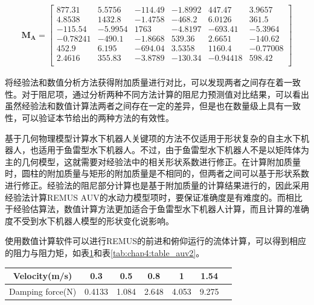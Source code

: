 \begin{equation}
\begin{aligned}
\bm{M_{A}} = \begin{bmatrix}
     877.31 &   5.5756 &  -114.49 &  -1.8992 &   447.47 &   3.9657\\
     4.8538 &   1432.8 &  -1.4758 &  -468.2  &   6.0126 &    361.5\\
     -115.54 &  -5.9954  &  1763  &  -4.8197 &  -693.41 &  -5.3964\\
     -0.78241 &  -490.1  &  -1.8668  &  539.36 & 2.6651  &  -140.62\\
     452.9  &  6.195 &  -694.04  &  3.5358 &   1160.4  & -0.77008\\
     2.4616  &  355.83 &  -3.8789 &  -130.34 &  -0.94418  &  598.42\\
         \end{bmatrix}
\end{aligned}
\end{equation}


将经验法和数值分析方法获得附加质量进行对比，可以发现两者之间存在着一致性。对于阻尼项，通过分析两种不同方法计算的阻尼力预测值对比结果，可以看出虽然经验法和数值计算法两者之间存在一定的差异，但是也在数量级上具有一致性，可以验证本节给出的两种方法的有效性。

基于几何物理模型计算水下机器人关键项的方法不仅适用于形状复杂的自主水下机器人，也适用于鱼雷型水下机器人。不过，由于鱼雷型水下机器人不是以矩阵体为主的几何模型，这就需要对经验法中的相关形状系数进行修正。在计算附加质量时，圆柱的附加质量与矩形的附加质量是不相同的，但两者之间可以基于形状系数进行修正。经验法的阻尼部分计算也是基于附加质量的计算结果进行的，因此采用经验法计算REMUS AUV的水动力模型项时，要保证准确度是有难度的。而相比于经验估算法，数值计算方法更加适合于鱼雷型水下机器人计算，而且计算的准确度不受到水下机器人模型的形状变化说影响。

使用数值计算软件可以进行REMUS的前进和俯仰运行的流体计算，可以得到相应的阻力与阻力矩，如表\ref{tab:chap4:table_auv1}和表\ref{tab:chap4:table_auv2}。

\begin{table}
\centering
\label{tab:chap4:table_auv1}
\begin{tabular}{ccccccc}
\toprule
 Velocity(m/s)   &0.3  & 0.5  &0.8 & 1 & 1.54   \\
\midrule
 Damping force(N) &0.4133 &1.084 &2.648 & 4.053 & 9.275  \\
\bottomrule
\end{tabular}
\end{table}

